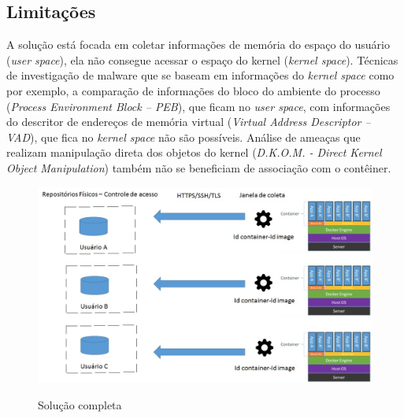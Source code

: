 \documentclass[conference]{IEEEtran}
\begin{document}
\subsection{Limitações}

A solução está focada em coletar informações de memória do espaço do usuário (\textit{user space}), ela não consegue acessar o espaço do kernel (\textit{kernel space}). 
%
Técnicas de investigação de malware que se baseam em informações do \textit{kernel space} como 	por exemplo, a comparação de informações do bloco do ambiente do processo (\textit{Process Environment Block -- PEB}), que ficam no \textit{user space}, com informações do descritor de endereços de memória virtual (\textit{Virtual Address Descriptor -- VAD}), que fica no \textit{kernel space} não são possíveis. 
%
Análise de ameaças que realizam manipulação direta dos objetos do kernel (\textit{D.K.O.M. - Direct Kernel Object Manipulation}) também não se beneficiam de associação com o contêiner.

\begin{figure}[htb!]
\caption{Solução completa}
\includegraphics[scale=0.25]{solucao.jpg}
\label{fig:Solucao}
\end{figure}

%
%
\end{document}
